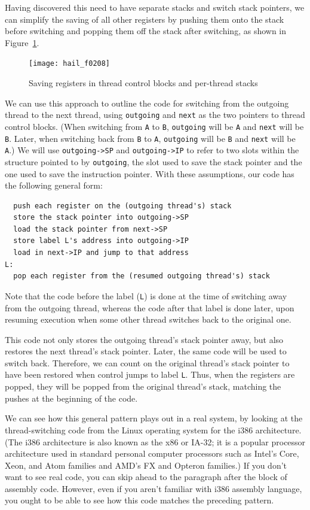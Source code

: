 Having discovered this need to have separate stacks and switch stack
pointers, we can simplify the saving of all other registers by
pushing them onto the stack before switching and popping them off the
stack after switching, as shown in Figure~\ref{scan-2-6}.
\begin{figure}
\centerline{\texttt{[image: hail\_f0208]}}
\caption{Saving registers in thread control blocks and per-thread stacks}
\label{scan-2-6}
\end{figure}
We can use this approach to outline the
code for switching from the outgoing thread to the next
thread, using \verb|outgoing| and \verb|next| as
the two pointers to thread control blocks.
(When switching from \verb|A| to \verb|B|, \verb|outgoing| will be
\verb|A| and \verb|next| will be \verb|B|.  Later, when switching back
from \verb|B| to \verb|A|, \verb|outgoing| will be \verb|B| and
\verb|next| will be \verb|A|.)
We will use
\verb|outgoing->SP| and \verb|outgoing->IP| to refer to two slots within the
structure pointed to by \verb|outgoing|, the slot used to save the stack
pointer and the one used to save the instruction pointer.  With these
assumptions, our code has the following general form:
\begin{verbatim}
  push each register on the (outgoing thread's) stack
  store the stack pointer into outgoing->SP
  load the stack pointer from next->SP
  store label L's address into outgoing->IP
  load in next->IP and jump to that address
L:
  pop each register from the (resumed outgoing thread's) stack
\end{verbatim}
Note that the code before the label (\verb|L|) is done at the time of
switching away from the outgoing thread, whereas the code after that
label is done later, upon resuming execution when some other thread
switches back to the original one.

This code not only stores the outgoing thread's stack pointer
away, but also restores the next thread's stack pointer.  Later, the
same code will be used to switch back.  Therefore, we can count on the
original thread's stack pointer to have been restored when control
jumps to label \verb|L|.  Thus, when the registers are popped, they
will be popped from the original thread's stack, matching the pushes
at the beginning of the code.

We can see how this general pattern plays out in a real system, by
looking at the thread-switching code from the Linux operating system
for the i386 architecture. (The i386 architecture is also known as the
x86 or IA-32; it is a popular processor architecture used in
standard personal computer processors such as Intel's Core, Xeon, and Atom
families and AMD's FX and Opteron families.)
If you don't want to see real code, you can skip ahead to
the paragraph after the block of assembly code.  However, even if you aren't familiar with i386 assembly language, you
ought to be able to see how this code matches the preceding pattern.

